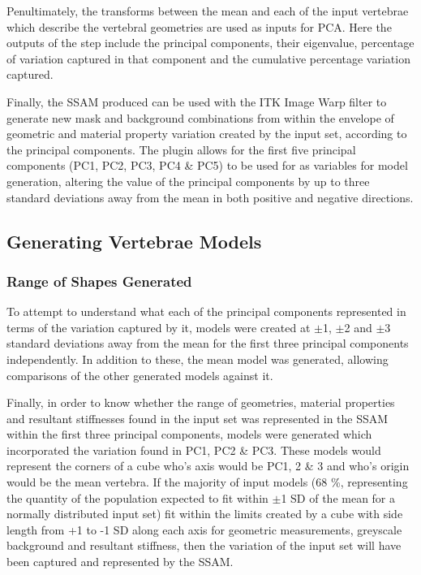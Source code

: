 Penultimately, the transforms between the mean and each of the input vertebrae
which describe the vertebral geometries are used as inputs for PCA.  Here the
outputs of the step include the principal components, their eigenvalue,
percentage of variation captured in that component and the cumulative
percentage variation captured.

Finally, the SSAM produced can be used with the ITK Image Warp filter to
generate new mask and background combinations from within the envelope of
geometric and material property variation created by the input set, according
to the principal components.  The plugin allows for the first five principal
components (PC1, PC2, PC3, PC4 \& PC5) to be used for as variables for model
generation, altering the value of the principal components by up to three
standard deviations away from the mean in both positive and negative
directions.

\subsection{Generating Vertebrae Models}

\subsubsection{Range of Shapes Generated}

To attempt to understand what each of the principal components represented in
terms of the variation captured by it, models were created at $\pm$1, $\pm$2
and $\pm$3 standard deviations away from the mean for the first three principal
components independently.  In addition to these, the mean model was generated,
allowing comparisons of the other generated models against it.

Finally, in order to know whether the range of geometries, material properties
and resultant stiffnesses found in the input set was represented in the SSAM
within the first three principal components, models were generated which
incorporated the variation found in PC1, PC2 \& PC3.  These models would
represent the corners of a cube who's axis would be PC1, 2 \& 3 and who's
origin would be the mean vertebra.  If the majority of input models (68 \%,
representing the quantity of the population expected to fit within $\pm$1 SD of
the mean for a normally distributed input set) fit within the limits created by
a cube with side length from +1 to -1 SD along each axis for geometric
measurements, greyscale background and resultant stiffness, then the variation
of the input set will have been captured and represented by the SSAM.

